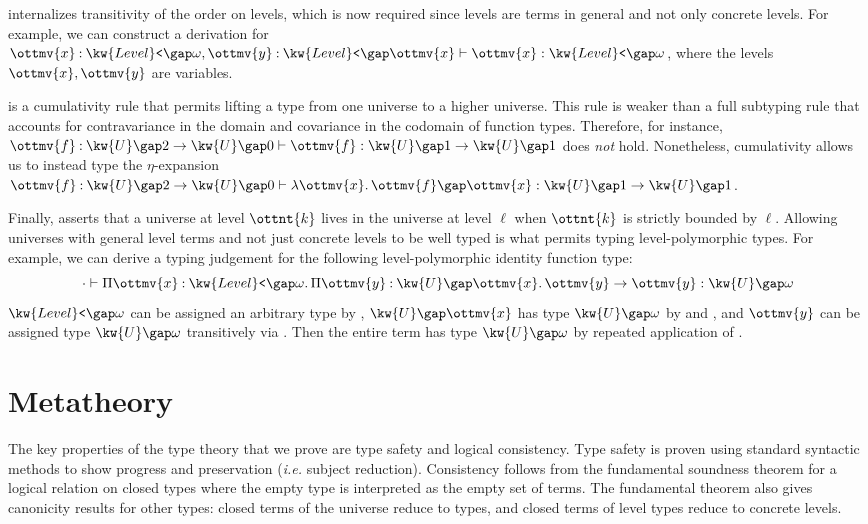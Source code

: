 \documentclass[a4paper,UKenglish,cleveref,autoref,thm-restate]{lipics-v2021}
\makeatletter
\newcommand{\ie}{\textit{i.e.}\@\xspace}
\makeatother
\begin{document}
 internalizes transitivity of the order on levels,
which is now required since levels are terms in general and not only concrete levels.
For example, we can construct a derivation for $   \ottmv{x}  \mathbin{:}   \kw{Level}\texttt{<} \gap   \omega    ,  \ottmv{y}  \mathbin{:}   \kw{Level}\texttt{<} \gap  \ottmv{x}    \vdash  \ottmv{x}  \mathrel{:}   \kw{Level}\texttt{<} \gap   \omega   $,
where the levels $\ottmv{x}, \ottmv{y}$ are variables.

 is a cumulativity rule that permits lifting a type
from one universe to a higher universe.
This rule is weaker than a full subtyping rule that accounts for
contravariance in the domain and covariance in the codomain of function types.
Therefore, for instance, $  \ottmv{f}  \mathbin{:}    \kw{U} \gap   2    \to   \kw{U} \gap   0      \vdash  \ottmv{f}  \mathrel{:}    \kw{U} \gap   1    \to   \kw{U} \gap   1    $ does \emph{not} hold.
Nonetheless, cumulativity allows us to instead type the $\eta$-expansion
$  \ottmv{f}  \mathbin{:}    \kw{U} \gap   2    \to   \kw{U} \gap   0      \vdash    \lambda  \ottmv{x}  \mathpunct{.}  \ottmv{f}   \gap  \ottmv{x}   \mathrel{:}    \kw{U} \gap   1    \to   \kw{U} \gap   1    $.

Finally,  asserts that a universe at level $\ottnt{k}$
lives in the universe at level $\ell$ when $\ottnt{k}$ is strictly bounded by $\ell$.
Allowing universes with general level terms and not just concrete levels
to be well typed is what permits typing level-polymorphic types.
For example, we can derive a typing judgement for
the following level-polymorphic identity function type:
$$  \cdot   \vdash    \Pi  \ottmv{x}  \mathbin{:}   \kw{Level}\texttt{<} \gap   \omega    \mathpunct{.}   \Pi  \ottmv{y}  \mathbin{:}   \kw{U} \gap  \ottmv{x}   \mathpunct{.}  \ottmv{y}    \to  \ottmv{y}   \mathrel{:}   \kw{U} \gap   \omega   $$
$ \kw{Level}\texttt{<} \gap   \omega  $ can be assigned an arbitrary type by ,
$ \kw{U} \gap  \ottmv{x} $ has type $ \kw{U} \gap   \omega  $ by  and ,
and $\ottmv{y}$ can be assigned type $ \kw{U} \gap   \omega  $ transitively
via .
Then the entire term has type $ \kw{U} \gap   \omega  $ by repeated application of .

\section{Metatheory}

The key properties of the type theory that we prove are
type safety and logical consistency.
Type safety is proven using standard syntactic methods
to show progress and preservation (\ie subject reduction).
Consistency follows from the fundamental soundness theorem
for a logical relation on closed types
where the empty type is interpreted as the empty set of terms.
The fundamental theorem also gives canonicity results for other types:
closed terms of the universe reduce to types,
and closed terms of level types reduce to concrete levels.
\end{document}
